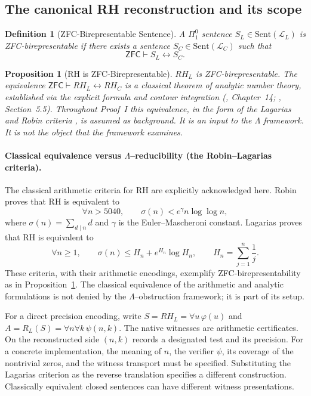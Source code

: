 \documentclass{article}
\newtheorem{proposition}[theorem]{Proposition}
\newtheorem{definition}[theorem]{Definition}
\theoremstyle{definition}
\begin{document}
\subsection{The canonical RH reconstruction and its scope}
\begin{definition}[ZFC-Birepresentable Sentence]
\label{def:zfc-birepresentable}
A $\Pi^0_1$ sentence $S_L \in \mathrm{Sent}(\mathcal{L}_L)$ is
\emph{ZFC-birepresentable} if there exists a sentence
$S_C \in \mathrm{Sent}(\mathcal{L}_C)$ such that
\[
\mathsf{ZFC} \vdash S_L \leftrightarrow S_C.
\]
\end{definition}

\begin{proposition}[RH is ZFC-Birepresentable]
\label{prop:RH-birepresentable}
$RH_L$ is ZFC-birepresentable. The equivalence
$\mathsf{ZFC} \vdash RH_L \leftrightarrow RH_C$ is a classical
theorem of analytic number theory, established via the explicit
formula and contour integration (\cite{Titchmarsh1986},
Chapter~14; \cite{Iwaniec2004}, Section~5.5). Throughout Proof~I this
equivalence, in the form of the Lagarias and Robin criteria
\cite{Lagarias2002,Robin1984}, is \emph{assumed} as background. It is
an input to the $\Lambda$ framework. It is not the object that the
framework examines.
\end{proposition}

\paragraph{Classical equivalence versus $\Lambda$--reducibility (the Robin--Lagarias criteria).}
\label{rem:robin-lagarias}
The classical arithmetic criteria for RH are explicitly acknowledged here.
Robin \cite{Robin1984} proves that RH is equivalent to
\[
\forall n>5040,\qquad \sigma(n)<e^\gamma n\log\log n,
\]
where $\sigma(n)=\sum_{d\mid n}d$ and $\gamma$ is the Euler--Mascheroni
constant. Lagarias \cite{Lagarias2002} proves that RH is equivalent to
\[
\forall n\geq 1,\qquad \sigma(n)\leq H_n+e^{H_n}\log H_n,
\qquad H_n=\sum_{j=1}^n\frac{1}{j}.
\]
These criteria, with their arithmetic encodings, exemplify
ZFC-birepresentability as in Proposition~\ref{prop:RH-birepresentable}.
The classical equivalence of the arithmetic and analytic formulations is
not denied by the $\Lambda$--obstruction framework; it is part of its setup.


For a direct precision encoding, write $S=RH_L=\forall u\,\varphi(u)$
and $A=R_L(S)=\forall n\forall k\,\psi(n,k)$. The native witnesses
are arithmetic certificates. On the reconstructed side $(n,k)$ records
a designated test and its precision. For a concrete implementation,
the meaning of $n$, the verifier $\psi$, its coverage of the nontrivial
zeros, and the witness transport must be specified. Substituting the
Lagarias criterion as the reverse translation specifies a different
construction. Classically equivalent closed sentences can have different
witness presentations.
\end{document}
